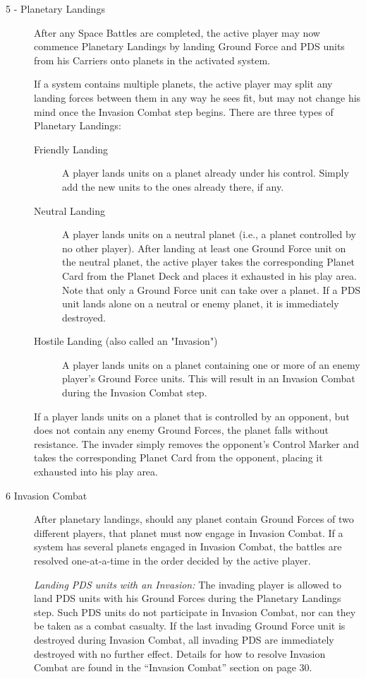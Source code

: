 \documentclass[11pt,fleqn]{book} %
\begin{document}
\begin{description}
\item [5 - Planetary Landings] 
After any Space Battles are completed, the active player may now commence Planetary Landings by landing Ground Force and PDS units from his Carriers onto planets in the activated system.

If a system contains multiple planets, the active player may split any landing forces between them in any way he sees fit, but may not change his mind once the Invasion Combat step begins. There are three types of Planetary Landings:
\begin{description}
    \item [Friendly Landing] A player lands units on a planet already under his control. Simply add the new units to the ones already there, if any.

    \item [Neutral Landing] A player lands units on a neutral planet (i.e., a planet controlled by no other player). After landing at least one Ground Force unit on the neutral planet, the active player takes the corresponding Planet Card from the Planet Deck and places it exhausted in his play area. Note that only a Ground Force unit can take over a planet. If a PDS unit lands alone on a neutral or enemy planet, it is immediately destroyed.

    \item[Hostile Landing (also called an "Invasion")] A player lands units on a planet containing one or more of an enemy player’s Ground Force units. This will result in an Invasion Combat during the Invasion Combat step.
\end{description}

If a player lands units on a planet that is controlled by an opponent, but does not contain any enemy Ground Forces, the planet falls without resistance. The invader simply removes the opponent’s Control Marker and takes the corresponding Planet Card from the opponent, placing it exhausted into his play area.

\item [6 Invasion Combat] After planetary landings, should any planet contain Ground Forces of two different players, that planet must now engage in Invasion Combat.  If a system has several planets engaged in Invasion Combat, the battles are resolved one-at-a-time in the order decided by the active player.

\emph{Landing PDS units with an Invasion:} The invading player is allowed to land PDS units with his Ground Forces during the Planetary Landings step. Such PDS units do not participate in Invasion Combat, nor can they be taken as a combat casualty. If the last invading Ground Force unit is destroyed during Invasion Combat, all invading PDS are immediately destroyed with no further effect. 
Details for how to resolve Invasion Combat are found in the “Invasion Combat” section on page 30.


\end{description}
\end{document}
